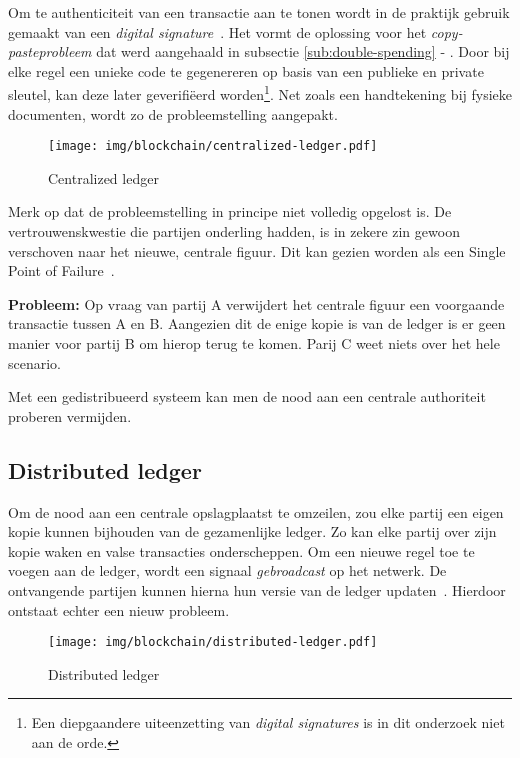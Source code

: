 Om te authenticiteit van een transactie aan te tonen wordt in de praktijk gebruik gemaakt van een \textit{digital signature}~\autocite{Salem2008}. Het vormt de oplossing voor het \textit{copy-pasteprobleem} dat werd aangehaald in subsectie \ref{sub:double-spending} - . Door bij elke regel een unieke code te gegenereren op basis van een publieke en private sleutel, kan deze later geverifiëerd worden\footnote{Een diepgaandere uiteenzetting van \textit{digital signatures} is in dit onderzoek niet aan de orde.}. Net zoals een handtekening bij fysieke documenten, wordt zo de probleemstelling aangepakt.

\begin{figure}[H]
	\centering
	\texttt{[image: img/blockchain/centralized-ledger.pdf]}
	\caption{\label{fig:centralized-ledger}Centralized ledger}
\end{figure}

Merk op dat de probleemstelling in principe niet volledig opgelost is. De vertrouwenskwestie die partijen onderling hadden, is in zekere zin gewoon verschoven naar het nieuwe, centrale figuur. Dit kan gezien worden als een Single Point of Failure~\autocite{Majaski2021}.

\textbf{Probleem:} 
Op vraag van partij A verwijdert het centrale figuur een voorgaande transactie tussen A en B. 
Aangezien dit de enige kopie is van de ledger is er geen manier voor partij B om hierop terug te komen. Parij C weet niets over het hele scenario.

Met een gedistribueerd systeem kan men de nood aan een centrale authoriteit proberen vermijden.


\subsection{Distributed ledger}
\label{sub:distributed-ledger}

Om de nood aan een centrale opslagplaatst te omzeilen, zou elke partij een eigen kopie kunnen bijhouden van de gezamenlijke ledger. Zo kan elke partij over zijn kopie waken en valse transacties onderscheppen. Om een nieuwe regel toe te voegen aan de ledger, wordt een signaal \textit{gebroadcast} op het netwerk. De ontvangende partijen kunnen hierna hun versie van de ledger updaten~\autocite{Nakamoto2008}. Hierdoor ontstaat echter een nieuw probleem.

\begin{figure}[H]
	\centering
	\texttt{[image: img/blockchain/distributed-ledger.pdf]}
	\caption{\label{fig:distributed-ledger}Distributed ledger}
\end{figure}

